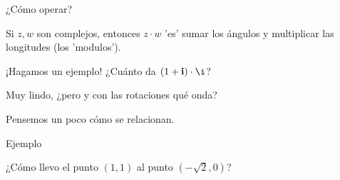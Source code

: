 \documentclass[10pt]{beamer}
\def\ii{\textbf{i}}
\begin{document}
\begin{frame}{¿Cómo operar?}
	
	Si $z,w$ son complejos, entonces $z \cdot w$ 'es' sumar los ángulos y multiplicar las longitudes (los 'modulos'). \pause
	
	
	
	¡Hagamos un ejemplo! ¿Cuánto da $(1+\ii)\cdot \i$?
	
	   
	   
\end{frame}


\begin{frame}

\Huge{Muy lindo, ¿pero y con las rotaciones qué onda?}

Pensemos un poco cómo se relacionan.



\end{frame}

\begin{frame}{Ejemplo}

¿Cómo llevo el punto $(1,1)$ al punto  $(-\sqrt{2},0)$?



\end{frame}
\end{document}
